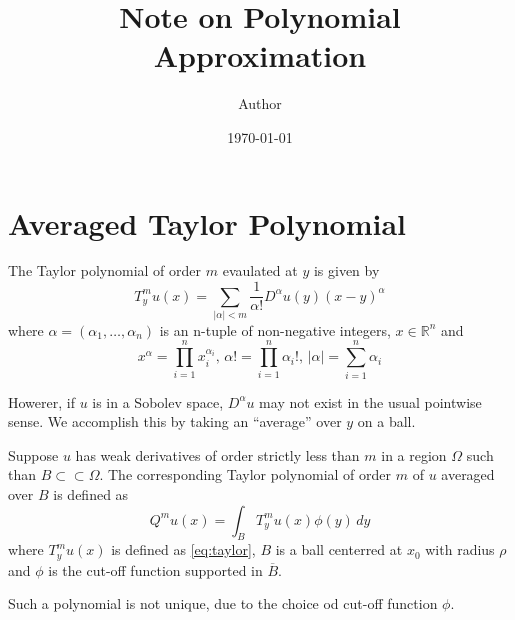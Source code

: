 \documentclass{article}
\title{Note on Polynomial Approximation}
\author{Author}
\date{\today}
\begin{document}
\maketitle

\section{Averaged Taylor Polynomial}

\begin{definition}
    The Taylor polynomial of order $m$ evaulated at $y$ is given by
    \begin{equation}\label{eq:taylor}
        T_y^mu(x) = \sum_{|\alpha| < m} \frac{1}{\alpha !} D^\alpha u(y) (x-y)^\alpha
    \end{equation}
    where $\alpha = (\alpha_1,\dots,\alpha_n)$ is an n-tuple of non-negative integers, $x \in \mathbb{R}^n$ and
    \[
        x^{\alpha} = \prod_{i=1}^n x_i^{\alpha_i},\,
        \alpha ! = \prod_{i=1}^n \alpha_i!,\,
        \vert \alpha \vert = \sum_{i=1}^n \alpha_i
    \]
\end{definition}

Howerer, if $u$ is in a Sobolev space, $D^\alpha u$ may not exist in the usual pointwise sense.
We accomplish this by taking an ``average'' over $y$ on a ball.


\begin{definition}
    Suppose $u$ has weak derivatives of order strictly less than $m$ in a region $\Omega$ such than $B \subset\subset \Omega$.
    The corresponding Taylor polynomial of order $m$ of $u$ averaged over $B$ is defined as
    \begin{equation}\label{eq:avg_taylor}
        Q^m u(x) = \int_B T_y^m u(x) \phi(y)\,dy
    \end{equation}
    where $T_y^m u(x)$ is defined as \eqref{eq:taylor}, $B$ is a ball centerred at $x_0$ with radius $\rho$ and $\phi$ is the cut-off function supported in $\overline{B}$.
\end{definition}

\begin{remark}
    Such a polynomial is not unique, due to the choice od cut-off function $\phi$.
\end{remark}
\end{document}
